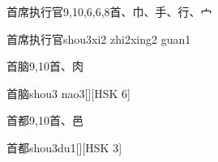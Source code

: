 \begin{Entry}{首席执行官}{9,10,6,6,8}{⾸、⼱、⼿、⾏、⼧}
  \begin{Phonetics}{首席执行官}{shou3xi2 zhi2xing2 guan1}
  \end{Phonetics}
\end{Entry}

\begin{Entry}{首脑}{9,10}{⾸、⾁}
  \begin{Phonetics}{首脑}{shou3 nao3}[][HSK 6]
  \end{Phonetics}
\end{Entry}

\begin{Entry}{首都}{9,10}{⾸、⾢}
  \begin{Phonetics}{首都}{shou3du1}[][HSK 3]
  \end{Phonetics}
\end{Entry}


